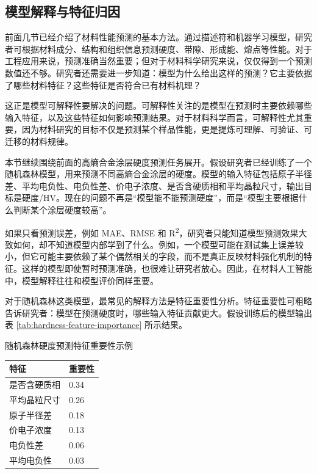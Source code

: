 \subsection{模型解释与特征归因}

前面几节已经介绍了材料性能预测的基本方法。通过描述符和机器学习模型，研究者可根据材料成分、结构和组织信息预测硬度、带隙、形成能、熔点等性能。对于工程应用来说，预测准确当然重要；但对于材料科学研究来说，仅仅得到一个预测数值还不够。研究者还需要进一步知道：模型为什么给出这样的预测？它主要依据了哪些材料特征？这些特征是否符合已有材料机理？


这正是模型可解释性要解决的问题。可解释性关注的是模型在预测时主要依赖哪些输入特征，以及这些特征如何影响预测结果。对于材料科学而言，可解释性尤其重要，因为材料研究的目标不仅是预测某个样品性能，更是提炼可理解、可验证、可迁移的材料规律。


本节继续围绕前面的高熵合金涂层硬度预测任务展开。假设研究者已经训练了一个随机森林模型，用来预测不同高熵合金涂层的硬度。模型的输入特征包括原子半径差、平均电负性、电负性差、价电子浓度、是否含硬质相和平均晶粒尺寸，输出目标是硬度/HV。现在的问题不再是“模型能不能预测硬度”，而是“模型主要根据什么判断某个涂层硬度较高”。


如果只看预测误差，例如 MAE、RMSE 和 R\textsuperscript{2}，研究者只能知道模型预测效果大致如何，却不知道模型内部学到了什么。例如，一个模型可能在测试集上误差较小，但它可能主要依赖了某个偶然相关的字段，而不是真正反映材料强化机制的特征。这样的模型即使暂时预测准确，也很难让研究者放心。因此，在材料人工智能中，模型解释往往和模型评价同样重要。


对于随机森林这类模型，最常见的解释方法是特征重要性分析。特征重要性可粗略告诉研究者：模型在预测硬度时，哪些输入特征贡献更大。假设训练后的模型输出表 \ref{tab:hardness-feature-importance} 所示结果。


\begin{formalTable}[htbp]
\caption{随机森林硬度预测特征重要性示例}
\label{tab:hardness-feature-importance}
\begin{tabularx}{\textwidth}{@{}YY@{}}
\toprule
\textbf{特征} & \textbf{重要性} \\
\midrule
是否含硬质相 & 0.34 \\
平均晶粒尺寸 & 0.26 \\
原子半径差 & 0.18 \\
价电子浓度 & 0.13 \\
电负性差 & 0.06 \\
平均电负性 & 0.03 \\
\bottomrule
\end{tabularx}
\end{formalTable}

